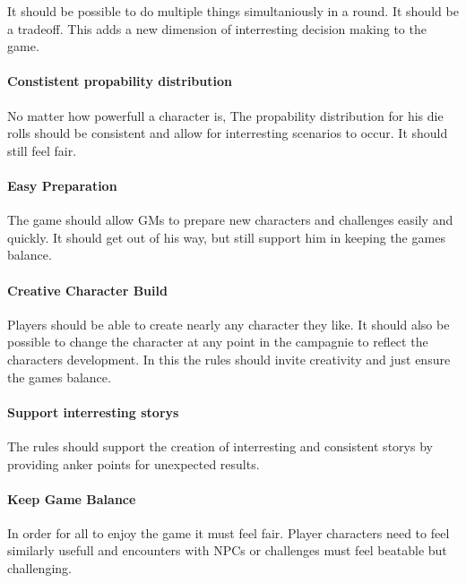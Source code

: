 \documentclass[11pt]{article}
\begin{document}
{It should be possible to do multiple things simultaniously in a round. It should be a tradeoff. This adds a new dimension of interresting decision making to the game.

\paragraph*{Constistent propability distribution}
\label{sec:org9f3b9a2}

No matter how powerfull a character is, The propability distribution for his die rolls should be consistent and allow for interresting scenarios to occur. It should still feel fair.

\paragraph*{Easy Preparation}
\label{sec:org8e6e66b}

The game should allow GMs to prepare new characters and challenges easily and quickly. It should get out of his way, but still support him in keeping the games balance.

\paragraph*{Creative Character Build}
\label{sec:orga8ed255}

Players should be able to create nearly any character they like. It should also be possible to change the character at any point in the campagnie to reflect the characters development. In this the rules should invite creativity and just ensure the games balance.

\paragraph*{Support interresting storys}
\label{sec:org1f75cc2}

The rules should support the creation of interresting and consistent storys by providing anker points for unexpected results.

\paragraph*{Keep Game Balance}
\label{sec:org62f18d3}

In order for all to enjoy the game it must feel fair. Player characters need to feel similarly usefull and encounters with NPCs or challenges must feel beatable but challenging.

}
\end{document}
